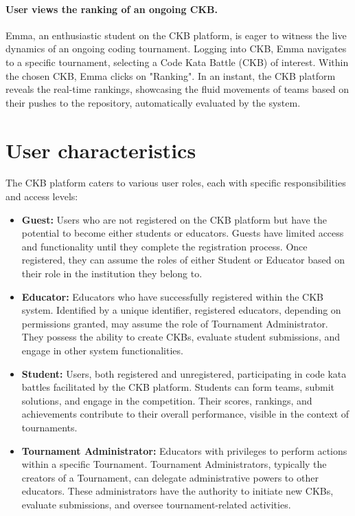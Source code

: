 \paragraph*{User views the ranking of an ongoing CKB.}
Emma, an enthusiastic student on the CKB platform, is eager to witness the live dynamics of an ongoing coding tournament.
Logging into CKB, Emma navigates to a specific tournament, selecting a Code Kata Battle (CKB) of interest.
Within the chosen CKB, Emma clicks on "Ranking". In an instant, the CKB platform reveals the real-time rankings, showcasing the fluid movements of teams based on their pushes to the repository, automatically evaluated by the system.


\section{User characteristics}
\label{sec:user_characteristics}%
The CKB platform caters to various user roles, each with specific responsibilities and access levels:
\begin{itemize}
    \item \textbf{Guest:}  Users who are not registered on the CKB platform but have the potential to become either students or educators. 
    Guests have limited access and functionality until they complete the registration process. 
    Once registered, they can assume the roles of either Student or Educator based on their role in the institution they belong to.
    \item \textbf{Educator:} Educators who have successfully registered within the CKB system. Identified by a unique identifier, registered educators, depending on permissions granted, may assume the role of Tournament Administrator. 
    They possess the ability to create CKBs, evaluate student submissions, and engage in other system functionalities.
    \item \textbf{Student:} Users, both registered and unregistered, participating in code kata battles facilitated by the CKB platform. 
    Students can form teams, submit solutions, and engage in the competition. 
    Their scores, rankings, and achievements contribute to their overall performance, visible in the context of tournaments.
    \item \textbf{Tournament Administrator:} Educators with privileges to perform actions within a specific Tournament. Tournament Administrators, typically the creators of a Tournament, can delegate administrative powers to other educators. 
    These administrators have the authority to initiate new CKBs, evaluate submissions, and oversee tournament-related activities.
\end{itemize}